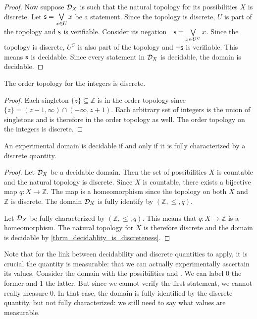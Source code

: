 \documentclass[11pt,letterpaper,fleqn]{memoir} %
\begin{document}
\begin{mathSection}
\begin{proof}
	Now suppose $\mathcal{D}_X$ is such that the natural topology for its possibilities $X$ is discrete. Let $\mathsf{s} = \bigvee\limits_{x \in U} x$ be a statement. Since the topology is discrete, $U$ is part of the topology and $\mathsf{s}$ is verifiable. Consider its negation $\neg\mathsf{s} = \bigvee\limits_{x \in U^C} x$. Since the topology is discrete, $U^C$ is also part of the topology and $\neg\mathsf{s}$ is verifiable. This means $\mathsf{s}$ is decidable. Since every statement in $\mathcal{D}_X$ is decidable, the domain is decidable.
\end{proof}
	
\begin{prop}
	The order topology for the integers is discrete.
\end{prop}
\begin{proof}
	Each singleton $\{z\} \subseteq \mathbb{Z}$ is in the order topology since $\{z\} = (z-1, \infty) \cap (-\infty, z+1)$. Each arbitrary set of integers is the union of singletons and is therefore in the order topology as well. The order topology on the integers is discrete.
\end{proof}
	
	\begin{prop}
		An experimental domain is decidable if and only if it is fully characterized by a discrete quantity.
	\end{prop}
	
	\begin{proof}
		Let $\mathcal{D}_X$ be a decidable domain. Then the set of possibilities $X$ is countable and the natural topology is discrete. Since $X$ is countable, there exists a bijective map $q: X \to \mathbb{Z}$. The map is a homeomorphism since the topology on both $X$ and $\mathbb{Z}$ is discrete. The domain $\mathcal{D}_X$ is fully identify by $(\mathbb{Z}, \leq, q)$.
		
		Let $\mathcal{D}_X$ be fully characterized by $(\mathbb{Z}, \leq, q)$. This means that $q : X \to \mathbb{Z}$ is a homeomorphism. The natural topology for $X$ is therefore discrete and the domain is decidable by \ref{thrm_decidablity_is_discreteness}.
	\end{proof}	
	
\end{mathSection}

Note that for the link between decidability and discrete quantities to apply, it is crucial the quantity is measurable: that we can actually experimentally ascertain its values. Consider the domain with the possibilities  and . We can label 0 the former and 1 the latter. But since we cannot verify the first statement, we cannot really measure 0. In that case, the domain is fully identified by the discrete quantity, but not fully characterized: we still need to say what values are measurable.
\end{document}
